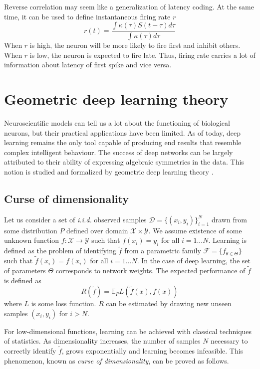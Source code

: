 \documentclass[oneside,english,logo]{amuthesis}
\begin{document}
Reverse correlation may seem like a generalization of latency coding. At the same time, it can be used to define instantaneous firing rate $r$
\[
r(t) = \frac{\int \kappa(\tau) S(t-\tau)d\tau}{\int \kappa(\tau) d\tau}
\]
When $r$ is high, the neuron will be more likely to fire first and inhibit others. When $r$ is low, the neuron is expected to fire late. Thus, firing rate carries a lot of information about latency of first spike and vice versa.

\section{Geometric deep learning theory}

Neuroscientific models can tell us a lot about the functioning of biological neurons, but their practical applications have been limited. As of today, deep learning remains the only tool capable of producing end results that resemble complex intelligent behaviour.
The success of deep networks can be largely attributed to their ability of expressing algebraic symmetries in the data. This notion is studied and formalized by geometric deep learning theory \cite{geom_deep_learn}.

\subsection{Curse of dimensionality}

Let us consider a set of \textit{i.i.d.} observed samples $\mathcal{D}=\{(x_i,y_i)\}_{i=1}^N$ drawn from some distribution $P$ defined over domain $\mathcal{X}\times \mathcal{Y}$. We assume existence of some unknown function $f:\mathcal{X}\rightarrow\mathcal{Y}$ such that $f(x_i)=y_i$ for all $i=1...N$. Learning is defined as the problem of identifying $\tilde{f}$ from a parametric family $\mathcal{F}=\{f_{\theta\in\Theta}\}$ such that $\tilde{f}(x_i)=f(x_i)$ for all $i=1...N$. In the case of deep learning, the set of parameters $\Theta$ corresponds to network weights. The expected performance  of $\tilde{f}$ is defined as 
\[
R(\tilde{f})=\mathbb{E}_{P} L(\tilde{f}(x),f(x))
\]
where $L$ is some loss function. $R$ can be estimated by drawing new unseen samples $(x_i,y_i)$ for $i>N$.

For low-dimensional functions, learning can be achieved with classical techniques of statistics. As dimensionality increases, the number of samples $N$  necessary to correctly identify $\tilde{f}$, grows exponentially and learning becomes infeasible. This phenomenon, known as \textit{curse of dimensionality}, can be proved as follows.
\end{document}
